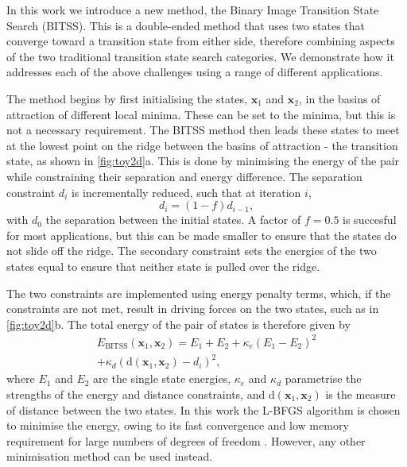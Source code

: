 \documentclass[aps,prl,twocolumn,10pt,groupedaddress]{revtex4-2}
\begin{document}
In this work we introduce a new method, the Binary Image Transition State Search (BITSS).
This is a double-ended method that uses two states that converge toward a transition state from either side, therefore combining aspects of the two traditional transition state search categories.
We demonstrate how it addresses each of the above challenges using a range of different applications.


The method begins by first initialising the states, $\bm{x}_1$ and $\bm{x}_2$, in the basins of attraction of different local minima.
These can be set to the minima, but this is not a necessary requirement.
The BITSS method then leads these states to meet at the lowest point on the ridge between the basins of attraction - the transition state, as shown in \cref{fig:toy2d}a.
This is done by minimising the energy of the pair while constraining their separation and energy difference.
The separation constraint $d_i$ is incrementally reduced, such that at iteration $i$,
\begin{equation}\label{eq:diteration}
  d_i = (1 - f) d_{i-1},
\end{equation}
with $d_0$ the separation between the initial states.
A factor of $f = 0.5$ is succesful for most applications, but this can be made smaller to ensure that the states do not slide off the ridge.
The secondary constraint sets the energies of the two states equal to ensure that neither state is pulled over the ridge.

The two constraints are implemented using energy penalty terms, which, if the constraints are not met, result in driving forces on the two states, such as in \cref{fig:toy2d}b.
The total energy of the pair of states is therefore given by
\begin{multline}\label{eq:bitss}
  E_\text{BITSS}(\bm{x}_1, \bm{x}_2) = E_1 + E_2
    + \kappa_e \left( E_1 - E_2 \right) ^2 \\
    + \kappa_d \left( \mathrm{d}(\bm{x}_1, \bm{x}_2) - d_i \right) ^2,
\end{multline}
where $E_1$ and $E_2$ are the single state energies, $\kappa_e$ and $\kappa_d$ parametrise the strengths of the energy and distance constraints, and $\mathrm{d}(\bm{x}_1, \bm{x}_2)$ is the measure of distance between the two states.
In this work the L-BFGS algorithm is chosen to minimise the energy, owing to its fast convergence and low memory requirement for large numbers of degrees of freedom \cite{Liu1989}.
However, any other minimisation method can be used instead.
\end{document}

